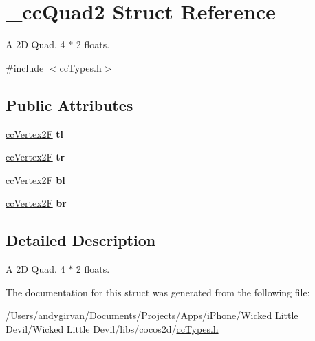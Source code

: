 \hypertarget{struct__cc_quad2}{\section{\-\_\-cc\-Quad2 Struct Reference}
\label{struct__cc_quad2}
}


A 2\-D Quad. 4 $\ast$ 2 floats.  




{\ttfamily \#include $<$cc\-Types.\-h$>$}

\subsection*{Public Attributes}
\begin{DoxyCompactItemize}
\item 
\hypertarget{struct__cc_quad2_a90515a91732078d94eebd8cb20efdedf}{\hyperlink{cc_types_8h_a3d0a9a02a1f9787a9ede91b9a74bf41f}{cc\-Vertex2\-F} {\bfseries tl}}\label{struct__cc_quad2_a90515a91732078d94eebd8cb20efdedf}

\item 
\hypertarget{struct__cc_quad2_a9c3b98cc3b55a3bb054f2b3dbb111dc0}{\hyperlink{cc_types_8h_a3d0a9a02a1f9787a9ede91b9a74bf41f}{cc\-Vertex2\-F} {\bfseries tr}}\label{struct__cc_quad2_a9c3b98cc3b55a3bb054f2b3dbb111dc0}

\item 
\hypertarget{struct__cc_quad2_a4a75f9e5d9aed039cd5e1bd6f9942a75}{\hyperlink{cc_types_8h_a3d0a9a02a1f9787a9ede91b9a74bf41f}{cc\-Vertex2\-F} {\bfseries bl}}\label{struct__cc_quad2_a4a75f9e5d9aed039cd5e1bd6f9942a75}

\item 
\hypertarget{struct__cc_quad2_ac06119d8e298bff04585f46e443b1e7b}{\hyperlink{cc_types_8h_a3d0a9a02a1f9787a9ede91b9a74bf41f}{cc\-Vertex2\-F} {\bfseries br}}\label{struct__cc_quad2_ac06119d8e298bff04585f46e443b1e7b}

\end{DoxyCompactItemize}


\subsection{Detailed Description}
A 2\-D Quad. 4 $\ast$ 2 floats. 

The documentation for this struct was generated from the following file\-:\begin{DoxyCompactItemize}
\item 
/\-Users/andygirvan/\-Documents/\-Projects/\-Apps/i\-Phone/\-Wicked Little Devil/\-Wicked Little Devil/libs/cocos2d/\hyperlink{cc_types_8h}{cc\-Types.\-h}\end{DoxyCompactItemize}
